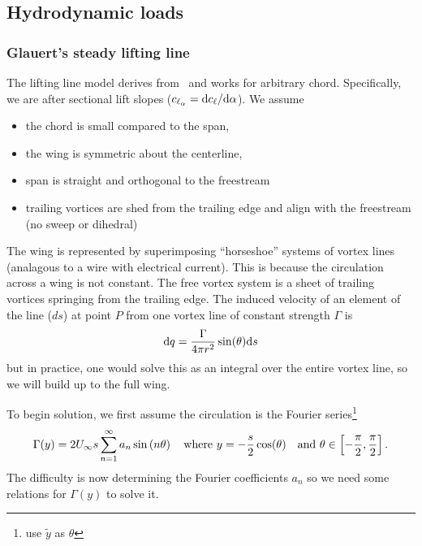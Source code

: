 \documentclass[10pt]{article}
\newcommand{\be}{\begin{eqnarray}}
\newcommand{\ee}{\end{eqnarray}}
\newcommand{\Uinf}{U_{\infty}}
\newcommand{\tn}[1]{\textnormal{#1}}
\begin{document}
\subsection{Hydrodynamic loads}
% 
\subsubsection{Glauert's steady lifting line}
% 
The lifting line model derives from~\citet[Ch. XI]{Glauert1983a} and works for arbitrary chord.
Specifically, we are after sectional lift slopes ($\textstyle c_{\ell_\alpha} = \tn{d}c_\ell/\tn{d}\alpha$).
We assume
\begin{itemize}
    \item the chord is small compared to the span,
    \item the wing is symmetric about the centerline,
    \item span is straight and orthogonal to the freestream
    \item trailing vortices are shed from the trailing edge and align with the freestream (no sweep or dihedral)
\end{itemize}

The wing is represented by superimposing ``horseshoe'' systems of vortex lines (analagous to a wire with electrical current).
This is because the circulation across a wing is not constant.
The free vortex system is a sheet of trailing vortices springing from the trailing edge.
The induced velocity of an element of the line ($ds$) at point $P$ from one vortex line of constant strength $\Gamma$ is
\be
\tn{d}q = \frac{\Gamma}{4 \pi r^2} \sin(\theta) \tn{d}s
\ee
but in practice, one would solve this as an integral over the entire vortex line, so we will build up to the full wing.

To begin solution, we first assume the circulation is the Fourier series\footnote{\citet{Kerwin2010} use $\tilde{y}$ as $\theta$}
\be
\Gamma(y) = 2 \Uinf s \sum_{n=1}^{\infty} a_n \sin \left( n \theta \right)
\quad \tn{where }
y = -\frac{s}{2}\cos(\theta)
\quad \tn{and }
\theta \in \left[-\frac{\pi}{2},\frac{\pi}{2}\right]
.
\ee
The difficulty is now determining the Fourier coefficients $a_n$ so we need some relations for $\Gamma(y)$ to solve it.
\end{document}
